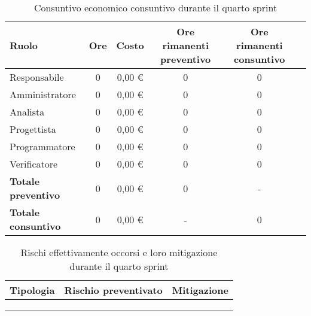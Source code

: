 \begin{table}[!h]
    \centering
    \begin{tabular}{ | l | c | c | c | c | c | }
        \hline
        \textbf{Ruolo} & \textbf{Ore} & \textbf{Costo} & \textbf{Ore rimanenti preventivo} & \textbf{Ore rimanenti consuntivo} \\
        \hline
        Responsabile               &  0   &    0,00 € &   0   &   0   \\
        Amministratore             &  0   &    0,00 € &   0   &   0   \\
        Analista                   &  0   &    0,00 € &   0   &   0   \\
        Progettista                &  0   &    0,00 € &   0   &   0   \\
        Programmatore              &  0   &    0,00 € &   0   &   0   \\
        Verificatore               &  0   &    0,00 € &   0   &   0   \\
        \hline
        \textbf{Totale preventivo} &  0   &    0,00 € &   0   &   -   \\
        \hline
        \textbf{Totale consuntivo} &  0   &    0,00 € &   -   &   0   \\
        \hline
    \end{tabular}
    \caption{Consuntivo economico consuntivo durante il quarto sprint} %
    \label{tab:27} %
\end{table}

\begin{table}[!h]
    \centering
    \begin{tabular}{ | p{6cm} | p{2.5cm} | p{7.5cm} | }
        \hline
        \textbf{Tipologia} & \textbf{Rischio preventivato} & \textbf{Mitigazione}  \\
        \hline
         & & \\
        \hline
         & & \\
        \hline
         & & \\
        \hline
    \end{tabular}
    \caption{Rischi effettivamente occorsi e loro mitigazione durante il quarto sprint} %
    \label{tab:28} %
\end{table}

